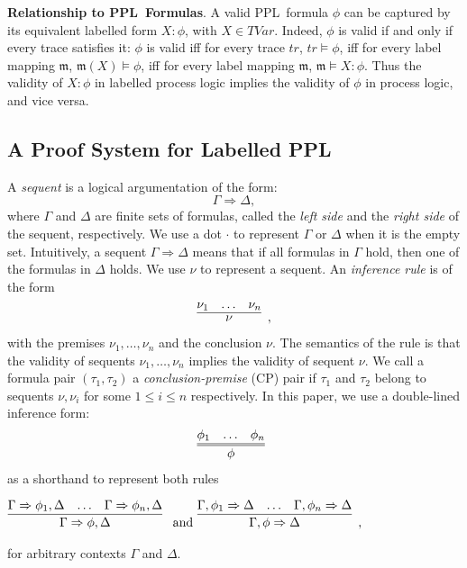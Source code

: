 \documentclass[manuscript,screen]{acmart}
\newcommand{\mfr}[1]{\mathfrak{#1}}
\newcommand{\lm}[0]{\mfr{m}}
\newcommand{\TVar}[0]{\textit{TVar}}
\newcommand{\PPL}[0]{\mbox{PPL}}
\begin{document}
\textbf{Relationship to \PPL\ Formulas}. 
A valid \PPL\ formula $\phi$ can be captured by its equivalent labelled form $X : \phi$, with $X\in \TVar$.
Indeed, $\phi$ is valid if and only if every trace satisfies it: $\phi$ is valid iff for every trace $tr$, $tr \models \phi$, iff for every label mapping $\lm$, $\lm(X) \models \phi$, iff for every label mapping $\lm$, $\lm \models X : \phi$.  Thus the validity of $X : \phi$ in labelled process logic implies the validity of $\phi$ in process logic, and vice versa. 

\subsection{A Proof System for Labelled \PPL}
\label{section:A Proof System for Labelled PPL}
A \emph{sequent} is a logical argumentation of the form: 
$$\Gamma\Rightarrow \Delta,$$ where $\Gamma$ and $\Delta$ are finite sets of formulas, called the \emph{left side} and the \emph{right side} of the sequent, respectively. 
We use a dot $\cdot$ to represent $\Gamma$ or $\Delta$ when it is the empty set. 
Intuitively, a sequent $\Gamma\Rightarrow \Delta$ means that if all formulas in $\Gamma$ hold, then one of the formulas in $\Delta$ holds. 
We use $\nu$ to represent a sequent. 
An \emph{inference rule} is of the form
$$
\begin{aligned}
\infer[]
{
    \nu
}
{
    \nu_1
    &
    \ldots 
    &
    \nu_n
}
,\end{aligned}$$
with the premises $\nu_1,\ldots,\nu_n$ and the conclusion $\nu$. 
The semantics of the rule is that the validity of sequents $\nu_1, \ldots, \nu_n$ implies the validity of sequent $\nu$. 
We call a formula pair $(\tau_1, \tau_2)$ a \emph{conclusion-premise} (CP) pair if $\tau_1$ and $\tau_2$ belong to sequents $\nu, \nu_i$ for some $1\le i\le n$ respectively. 
In this paper, we use a double-lined inference form:
$$
\begin{aligned}
   \infer=[]
{\phi}
{\phi_1 & \ldots  & \phi_n} 
\end{aligned}
$$
as a shorthand to represent both rules
\begin{center}
$
\begin{aligned}
    \infer[]
{
    \Gamma\Rightarrow \phi, \Delta
}
{
    \Gamma\Rightarrow \phi_1, \Delta
    &
    \ldots  
    &
    \Gamma\Rightarrow \phi_n, \Delta
}
\mbox{ and }
\infer[]
{
    \Gamma, \phi\Rightarrow \Delta
}
{
    \Gamma, \phi_1\Rightarrow  \Delta
    &
    \ldots
    &
    \Gamma, \phi_n\Rightarrow \Delta
}, 
\end{aligned}
$
\end{center}
for arbitrary contexts $\Gamma$ and $\Delta$. 
\end{document}
